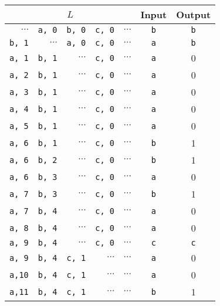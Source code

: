 \begin{tabular}{rrrrrcc}
    \multicolumn{5}{c}{$L$} & Input & Output \\
    \hline
    $\cdots$ & {\tt a, {\rm 0}} & {\tt b, {\rm 0}} & {\tt c, {\rm 0}} & $\cdots$ & {\tt b} & {\tt b}\\
    {\tt b, {\rm 1}} &         $\cdots$ & {\tt a, {\rm 0}} & {\tt c, {\rm 0}} & $\cdots$ & {\tt a} & {\tt b}\\
    {\tt a, {\rm 1}} & {\tt b, {\rm 1}} &         $\cdots$ & {\tt c, {\rm 0}} & $\cdots$ & {\tt a} & 0\\
    {\tt a, {\rm 2}} & {\tt b, {\rm 1}} &         $\cdots$ & {\tt c, {\rm 0}} & $\cdots$ & {\tt a} & 0\\
    {\tt a, {\rm 3}} & {\tt b, {\rm 1}} &         $\cdots$ & {\tt c, {\rm 0}} & $\cdots$ & {\tt a} & 0\\
    {\tt a, {\rm 4}} & {\tt b, {\rm 1}} &         $\cdots$ & {\tt c, {\rm 0}} & $\cdots$ & {\tt a} & 0\\
    {\tt a, {\rm 5}} & {\tt b, {\rm 1}} &         $\cdots$ & {\tt c, {\rm 0}} & $\cdots$ & {\tt a} & 0\\
    {\tt a, {\rm 6}} & {\tt b, {\rm 1}} &         $\cdots$ & {\tt c, {\rm 0}} & $\cdots$ & {\tt b} & 1\\
    {\tt a, {\rm 6}} & {\tt b, {\rm 2}} &         $\cdots$ & {\tt c, {\rm 0}} & $\cdots$ & {\tt b} & 1\\
    {\tt a, {\rm 6}} & {\tt b, {\rm 3}} &         $\cdots$ & {\tt c, {\rm 0}} & $\cdots$ & {\tt a} & 0\\
    {\tt a, {\rm 7}} & {\tt b, {\rm 3}} &         $\cdots$ & {\tt c, {\rm 0}} & $\cdots$ & {\tt b} & 1\\
    {\tt a, {\rm 7}} & {\tt b, {\rm 4}} &         $\cdots$ & {\tt c, {\rm 0}} & $\cdots$ & {\tt a} & 0\\
    {\tt a, {\rm 8}} & {\tt b, {\rm 4}} &         $\cdots$ & {\tt c, {\rm 0}} & $\cdots$ & {\tt a} & 0\\
    {\tt a, {\rm 9}} & {\tt b, {\rm 4}} &         $\cdots$ & {\tt c, {\rm 0}} & $\cdots$ & {\tt c} & {\tt c}\\
    {\tt a, {\rm 9}} & {\tt b, {\rm 4}} & {\tt c, {\rm 1}} &         $\cdots$ & $\cdots$ & {\tt a} & 0\\
    {\tt a,{\rm 10}} & {\tt b, {\rm 4}} & {\tt c, {\rm 1}} &         $\cdots$ & $\cdots$ & {\tt a} & 0\\
    {\tt a,{\rm 11}} & {\tt b, {\rm 4}} & {\tt c, {\rm 1}} &         $\cdots$ & $\cdots$ & {\tt b} & 1
  \end{tabular}
